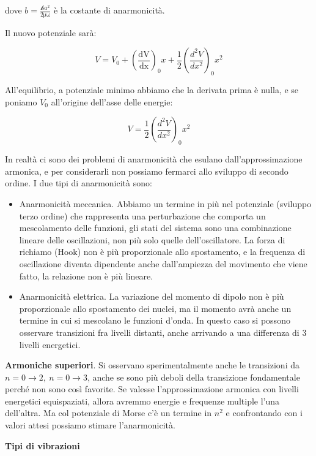 dove \(b = \frac{\mathcal{h}a^{2}}{2\text{μω}}\) è la costante di
anarmonicità.

Il nuovo potenziale sarà:

\[V = V_{0} + \left( \frac{\text{dV}}{\text{dx}} \right)_{0}x + \frac{1}{2}\left( \frac{d^{2}V}{dx^{2}} \right)_{0}x^{2}\]

All'equilibrio, a potenziale minimo abbiamo che la derivata prima è
nulla, e se poniamo \(V_{0}\) all'origine dell'asse delle energie:

\[V = \frac{1}{2}\left( \frac{d^{2}V}{dx^{2}} \right)_{0}x^{2}\]

In realtà ci sono dei problemi di anarmonicità che esulano
dall'approssimazione armonica, e per considerarli non possiamo fermarci
allo sviluppo di secondo ordine. I due tipi di anarmonicità sono:

\begin{itemize}
\item
  Anarmonicità meccanica. Abbiamo un termine in più nel potenziale
  (sviluppo terzo ordine) che rappresenta una perturbazione che comporta
  un mescolamento delle funzioni, gli stati del sistema sono una
  combinazione lineare delle oscillazioni, non più solo quelle
  dell'oscillatore. La forza di richiamo (Hook) non è più proporzionale
  allo spostamento, e la frequenza di oscillazione diventa dipendente
  anche dall'ampiezza del movimento che viene fatto, la relazione non è
  più lineare.
\item
  Anarmonicità elettrica. La variazione del momento di dipolo non è più
  proporzionale allo spostamento dei nuclei, ma il momento avrà anche un
  termine in cui si mescolano le funzioni d'onda. In questo caso si
  possono osservare transizioni fra livelli distanti, anche arrivando a
  una differenza di 3 livelli energetici.
\end{itemize}

\textbf{Armoniche superiori}. Si osservano sperimentalmente anche le
transizioni da \(n = 0 \rightarrow 2,\ n = 0 \rightarrow 3\), anche se
sono più deboli della transizione fondamentale perché non sono così
favorite. Se valesse l'approssimazione armonica con livelli energetici
equispaziati, allora avremmo energie e frequenze multiple l'una
dell'altra. Ma col potenziale di Morse c'è un termine in \(n^{2}\) e
confrontando con i valori attesi possiamo stimare l'anarmonicità.

\textbf{Tipi di vibrazioni}

